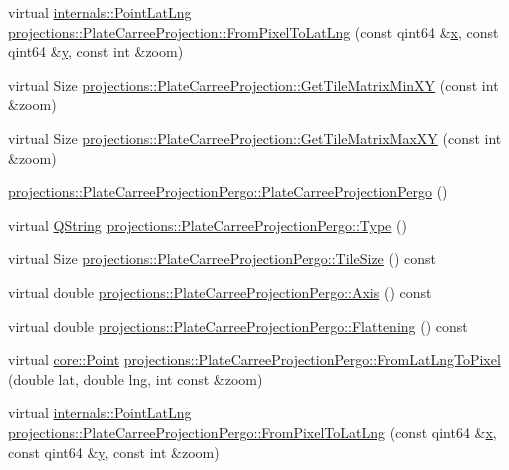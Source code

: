 \begin{DoxyCompactItemize}
virtual \hyperlink{structinternals_1_1_point_lat_lng}{internals\-::\-Point\-Lat\-Lng} \hyperlink{group___o_p_map_widget_gadd2ce1ff11cbb8b8704013b12cf8865f}{projections\-::\-Plate\-Carree\-Projection\-::\-From\-Pixel\-To\-Lat\-Lng} (const qint64 \&\hyperlink{_o_p_plots_8m_a9336ebf25087d91c818ee6e9ec29f8c1}{x}, const qint64 \&\hyperlink{_o_p_plots_8m_a2fb1c5cf58867b5bbc9a1b145a86f3a0}{y}, const int \&zoom)
\item 
virtual \-Size \hyperlink{group___o_p_map_widget_ga5e7a2f9214e18785a5c7c87321caea12}{projections\-::\-Plate\-Carree\-Projection\-::\-Get\-Tile\-Matrix\-Min\-X\-Y} (const int \&zoom)
\item 
virtual \-Size \hyperlink{group___o_p_map_widget_ga8523592554481d4a42f407d160ade5cd}{projections\-::\-Plate\-Carree\-Projection\-::\-Get\-Tile\-Matrix\-Max\-X\-Y} (const int \&zoom)
\item 
\hyperlink{group___o_p_map_widget_ga9efefe0ffe073b3074b5ada1a6f0f267}{projections\-::\-Plate\-Carree\-Projection\-Pergo\-::\-Plate\-Carree\-Projection\-Pergo} ()
\item 
virtual \hyperlink{group___u_a_v_objects_plugin_gab9d252f49c333c94a72f97ce3105a32d}{\-Q\-String} \hyperlink{group___o_p_map_widget_ga0c0b83ba2e36423002e0561797a75d6f}{projections\-::\-Plate\-Carree\-Projection\-Pergo\-::\-Type} ()
\item 
virtual \-Size \hyperlink{group___o_p_map_widget_ga459271797b70ca4aacc1bc616c8588e1}{projections\-::\-Plate\-Carree\-Projection\-Pergo\-::\-Tile\-Size} () const 
\item 
virtual double \hyperlink{group___o_p_map_widget_ga189bc30528175596e1010dae2d199d1d}{projections\-::\-Plate\-Carree\-Projection\-Pergo\-::\-Axis} () const 
\item 
virtual double \hyperlink{group___o_p_map_widget_ga03c9086ef72e6a349a5ab125cfd6533e}{projections\-::\-Plate\-Carree\-Projection\-Pergo\-::\-Flattening} () const 
\item 
virtual \hyperlink{structcore_1_1_point}{core\-::\-Point} \hyperlink{group___o_p_map_widget_gaf785f752ac316a8cb94c96dacabdc244}{projections\-::\-Plate\-Carree\-Projection\-Pergo\-::\-From\-Lat\-Lng\-To\-Pixel} (double lat, double lng, int const \&zoom)
\item 
virtual \hyperlink{structinternals_1_1_point_lat_lng}{internals\-::\-Point\-Lat\-Lng} \hyperlink{group___o_p_map_widget_ga3bd1d9693dd54a69baa88bed4785311d}{projections\-::\-Plate\-Carree\-Projection\-Pergo\-::\-From\-Pixel\-To\-Lat\-Lng} (const qint64 \&\hyperlink{_o_p_plots_8m_a9336ebf25087d91c818ee6e9ec29f8c1}{x}, const qint64 \&\hyperlink{_o_p_plots_8m_a2fb1c5cf58867b5bbc9a1b145a86f3a0}{y}, const int \&zoom)

\end{DoxyCompactItemize}
